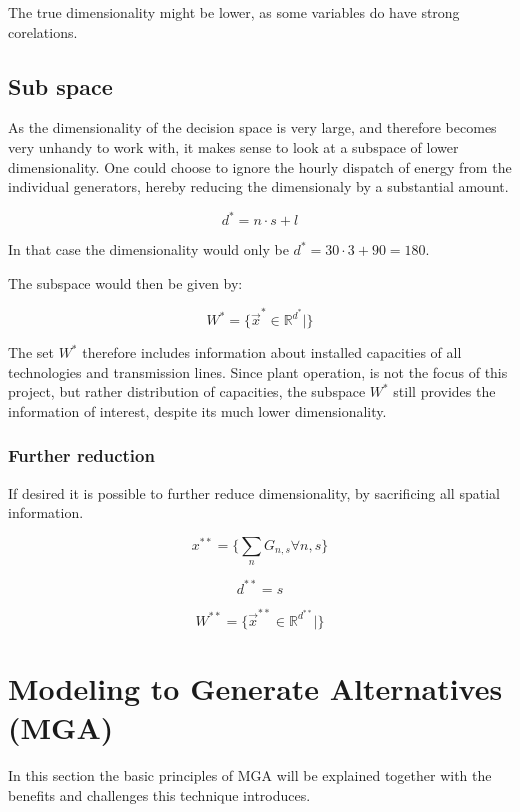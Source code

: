 The true dimensionality might be lower, as some variables do have strong corelations. 

\subsection{Sub space}

As the dimensionality of the decision space is very large, and therefore becomes very unhandy to work with, it makes sense to look at a subspace of lower dimensionality. One could choose to ignore the hourly dispatch of energy from the individual generators, hereby reducing the dimensionaly by a substantial amount. 

\begin{equation}
d^* = n\cdot s + l
\end{equation}

In that case the dimensionality would only be $d^* = 30\cdot 3 + 90 = 180$. 

The subspace would then be given by:

\begin{equation}
W^* = \{\vec{x}^* \in \mathbb{R}^{d^*} |    \}
\end{equation}

The set $W^*$ therefore includes information about installed capacities of all technologies and transmission lines. Since plant operation, is not the focus of this project, but rather distribution of capacities,  the subspace $W^*$ still provides the information of interest, despite its much lower dimensionality. 

\subsubsection{Further reduction}
If desired it is possible to further reduce dimensionality, by sacrificing all spatial information.

\begin{equation}
x^{**} = \{\sum_n G_{n,s} \forall n,s  \}
\end{equation} 

\begin{equation}
d^{**} = s
\end{equation}

\begin{equation}
W^{**} = \{\vec{x}^{**} \in \mathbb{R}^{d^{**}} |    \}
\end{equation}



\section{Modeling to Generate Alternatives (MGA)}\label{sec:MGA}
In this section the basic principles of MGA will be explained together with the benefits and challenges this technique introduces. 

